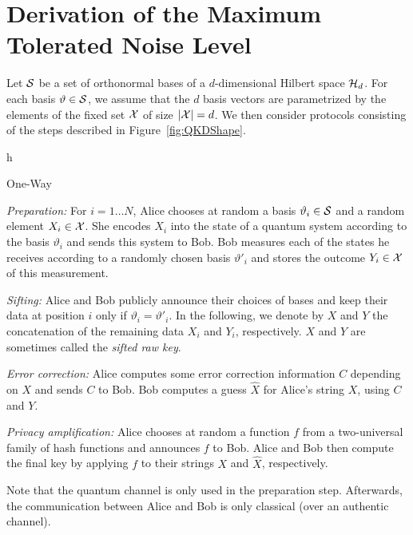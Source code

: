 \section{Derivation of the Maximum Tolerated Noise Level}
Let $\mathcal{S}$ be a set of orthonormal bases of a $d$-dimensional Hilbert
space $\mathcal{H}_d$. For each basis $\vartheta \in \mathcal{S}$, we assume that
the $d$ basis vectors are parametrized by the elements of the fixed
set $\mathcal{X}$ of size $|\mathcal{X}|=d$. We then consider \QKD protocols consisting
of the steps described in Figure~\ref{fig:QKDShape}.
\begin{myfigure}{h}
\begin{myprotocol}{One-Way \QKD}
\item \emph{Preparation:} For $i=1 \ldots N$, Alice chooses at random
  a basis $\vartheta_i \in \mathcal{S}$ and a random element $X_i \in \mathcal{X}$.
  She encodes $X_i$ into the state of a quantum system according to
  the basis $\vartheta_i$ and sends this system to Bob.  Bob measures
  each of the states he receives according to a randomly chosen basis
  $\vartheta'_i$ and stores the outcome $Y_i \in \mathcal{X}$ of this
  measurement. 
\item \emph{Sifting:} Alice and Bob publicly announce their choices of
  bases and keep their data at position $i$ only if $\vartheta_i =
  \vartheta'_i$. In the following, we denote by $X$ and $Y$ the
  concatenation of the remaining data $X_i$ and $Y_i$, respectively.
  $X$ and $Y$ are sometimes called the \emph{sifted raw key}. 
\item \emph{Error correction:} Alice computes some error correction
  information $C$ depending on $X$ and sends $C$ to Bob.  Bob computes
  a guess $\hat{X}$ for Alice's string $X$, using $C$ and
  $Y$. 
\item \emph{Privacy amplification:} Alice chooses at random a function
  $f$ from a two-universal family of hash functions and announces $f$
  to Bob. Alice and Bob then compute the final key by applying $f$ to
  their strings $X$ and $\hat{X}$, respectively. 
\end{myprotocol}
\caption{General form for {\em one-way} \QKD protocols.}\label{fig:QKDShape}
\end{myfigure} 

Note that the quantum channel is only used in the preparation step.
Afterwards, the communication between Alice and Bob
is only classical (over an authentic channel).

